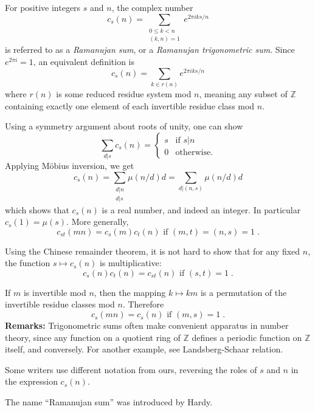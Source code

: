 \documentclass{article}
\begin{document}
For positive integers $s$ and $n$, the complex number
$$c_s(n)=\sum_{\substack{0\le k<n \\ (k,n)=1}}e^{2\pi iks/n}$$
is referred to as a \emph{Ramanujan sum}, or a \emph{Ramanujan trigonometric sum}.
Since $e^{2\pi i}=1$, an equivalent definition is
$$c_s(n)=\sum_{k\in r(n)}e^{2\pi iks/n}$$
where $r(n)$ is some reduced residue system mod $n$, meaning any
subset of $\mathbb{Z}$ containing exactly one element of each
invertible residue class mod $n$.

Using a symmetry argument about roots of unity, one can show
$$
\sum_{d|s}c_s(n)=
\begin{cases}
s & \textrm{if $s|n$} \\ 0 & \text{otherwise.}
\end{cases}
$$
Applying M\"obius inversion, we get
$$c_s(n)=\sum_{\substack{d|n \\ d|s}}\mu(n/d)d
=\sum_{d|(n,s)}\mu(n/d)d$$
which shows that $c_s(n)$ is a real number, and indeed an integer. 
In particular $c_s(1)=\mu(s)$. More generally,
$$c_{st}(mn)=c_s(m)c_t(n)\text{ if }(m,t)=(n,s)=1\;.$$

Using the Chinese remainder theorem, it is not hard to show that
for any fixed $n$, the function $s\mapsto c_s(n)$ is multiplicative:
$$c_s(n)c_t(n)=c_{st}(n) \text{ if }(s,t)=1 \;.$$

If $m$ is invertible mod $n$, then the mapping $k\mapsto km$
is a permutation of the invertible residue classes mod $n$. Therefore
$$c_s(mn)=c_s(n)\text{ if }(m,s)=1\;.$$
\textbf{Remarks: } Trigonometric sums often make
convenient apparatus in number theory, since any
function on a quotient ring of $\mathbb{Z}$ defines
a periodic function on $\mathbb{Z}$ itself, and conversely. For
another example, see Landsberg-Schaar relation.

Some writers use different notation from ours, reversing the roles
of $s$ and $n$ in the expression $c_s(n)$.

The name ``Ramanujan sum'' was introduced by Hardy.
\end{document}
